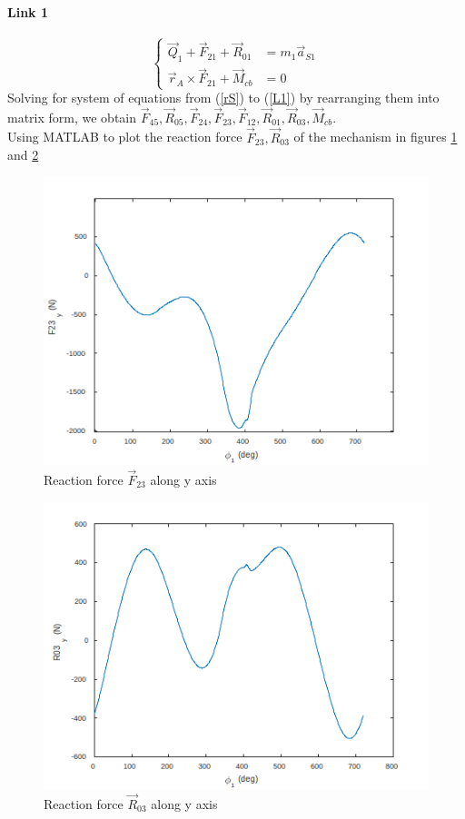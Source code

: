 \paragraph{Link 1}
\begin{equation}\label{L1}
\left\{
\begin{array}{cl}
\vec{Q}_{1}+\vec{F}_{21}+\vec{R}_{01}&=m_1\vec{a}_{S1}\\
\vec{r}_A\times \vec{F}_{21}+\vec{M}_{cb}&=0
\end{array} 
\right.
\end{equation}
Solving for system of equations from (\ref{rS}) to (\ref{L1}) by rearranging them into matrix form, we obtain $ \vec{F}_{45},\vec{R}_{05},\vec{F}_{24},\vec{F}_{23},\vec{F}_{12},\vec{R}_{01},\vec{R}_{03},\vec{M}_{cb} $.\\
Using MATLAB\textup{\textregistered} to plot the reaction force $ \vec{F}_{23},\vec{R}_{03} $ of the mechanism in figures \ref{fig:09} and \ref{fig:10}
\begin{figure}
	\centering
	\includegraphics[width=0.7\linewidth]{09}
	\caption{Reaction force $\vec{F}_{23}$ along y axis}
	\label{fig:09}
\end{figure}
\begin{figure}
	\centering
	\includegraphics[width=0.7\linewidth]{10}
	\caption{Reaction force $\vec{R}_{03}$ along y axis}
	\label{fig:10}
\end{figure}

